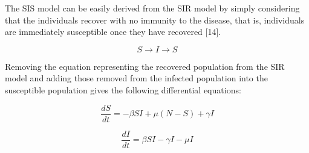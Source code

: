 The SIS model can be easily derived from the SIR model by simply considering that the individuals recover with no immunity to the disease, that is, individuals are immediately susceptible once they have recovered [14].

\begin{equation}
S \rightarrow I \rightarrow S
\end{equation}

Removing the equation representing the recovered population from the SIR model and adding those removed from the infected population into the susceptible population gives the following differential equations:

\begin{equation}
\frac{dS}{dt} = -\beta S I + \mu(N - S) + \gamma I
\end{equation}

\begin{equation}
\frac{dI}{dt} = \beta S I - \gamma I - \mu I
\end{equation}